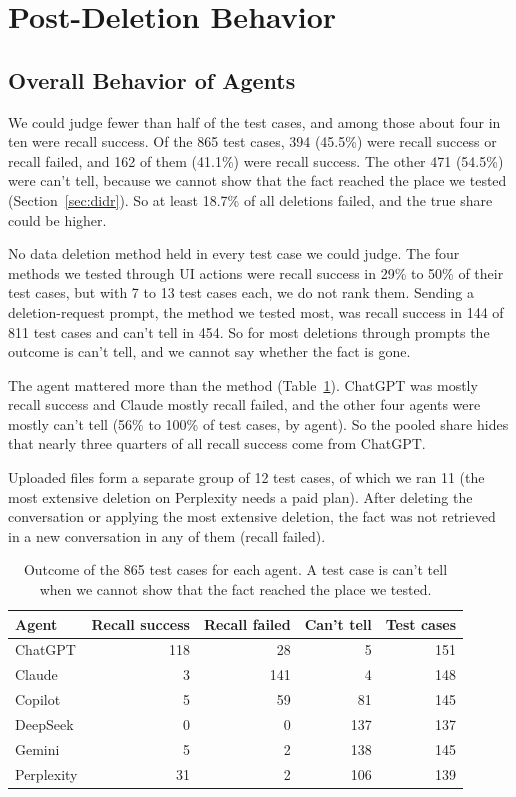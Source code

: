     \section{Post-Deletion Behavior}
    \label{sec:tech_results}

    \subsection{Overall Behavior of Agents}
    \label{sec:overall}

    We could judge fewer than half of the test cases, and among those about four in ten were recall success. Of the 865 test cases, 394 (45.5\%) were recall success or recall failed, and 162 of them (41.1\%) were recall success. The other 471 (54.5\%) were can't tell, because we cannot show that the fact reached the place we tested (Section~\ref{sec:didr}). So at least 18.7\% of all deletions failed, and the true share could be higher.

    No data deletion method held in every test case we could judge. The four methods we tested through UI actions were recall success in 29\% to 50\% of their test cases, but with 7 to 13 test cases each, we do not rank them. Sending a deletion-request prompt, the method we tested most, was recall success in 144 of 811 test cases and can't tell in 454. So for most deletions through prompts the outcome is can't tell, and we cannot say whether the fact is gone.

    The agent mattered more than the method (Table~\ref{tab:outcomes-agent}). ChatGPT was mostly recall success and Claude mostly recall failed, and the other four agents were mostly can't tell (56\% to 100\% of test cases, by agent). So the pooled share hides that nearly three quarters of all recall success come from ChatGPT.

    Uploaded files form a separate group of 12 test cases, of which we ran 11 (the most extensive deletion on Perplexity needs a paid plan). After deleting the conversation or applying the most extensive deletion, the fact was not retrieved in a new conversation in any of them (recall failed).

    \begin{table}[!t]
    \centering
    \caption{Outcome of the 865 test cases for each agent. A test case is can't tell when we cannot show that the fact reached the place we tested.}
    \label{tab:outcomes-agent}
    \footnotesize
    \begin{tabular}{@{}lrrrr@{}}
    \toprule
    Agent & Recall success & Recall failed & Can't tell & Test cases \\
    \midrule
    ChatGPT & 118 & 28 & 5 & 151 \\
    Claude & 3 & 141 & 4 & 148 \\
    Copilot & 5 & 59 & 81 & 145 \\
    DeepSeek & 0 & 0 & 137 & 137 \\
    Gemini & 5 & 2 & 138 & 145 \\
    Perplexity & 31 & 2 & 106 & 139 \\
    \bottomrule
    \end{tabular}
    \end{table}


